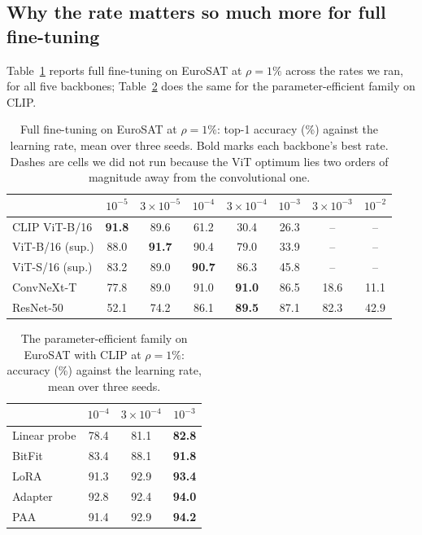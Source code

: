 \documentclass[preprint,12pt]{elsarticle}
\begin{document}
\subsection{Why the rate matters so much more for full fine-tuning}
\label{sec:lr}

Table~\ref{tab:lr-full} reports full fine-tuning on EuroSAT at $\rho=1\%$ across
the rates we ran, for all five backbones; Table~\ref{tab:lr-peft} does the same
for the parameter-efficient family on CLIP.

\begin{table}[t]
\centering
\caption{Full fine-tuning on EuroSAT at $\rho=1\%$: top-1 accuracy (\%) against the learning rate, mean over three seeds. Bold marks each backbone's best rate. Dashes are cells we did not run because the ViT optimum lies two orders of magnitude away from the convolutional one.}
\label{tab:lr-full}
\small
\setlength{\tabcolsep}{4pt}
\begin{tabular}{lccccccc}
\toprule
 & $10^{-5}$ & $3\times10^{-5}$ & $10^{-4}$ & $3\times10^{-4}$ & $10^{-3}$ & $3\times10^{-3}$ & $10^{-2}$ \\
\midrule
CLIP ViT-B/16 & \textbf{91.8} & 89.6 & 61.2 & 30.4 & 26.3 & -- & -- \\
ViT-B/16 (sup.) & 88.0 & \textbf{91.7} & 90.4 & 79.0 & 33.9 & -- & -- \\
ViT-S/16 (sup.) & 83.2 & 89.0 & \textbf{90.7} & 86.3 & 45.8 & -- & -- \\
ConvNeXt-T & 77.8 & 89.0 & 91.0 & \textbf{91.0} & 86.5 & 18.6 & 11.1 \\
ResNet-50 & 52.1 & 74.2 & 86.1 & \textbf{89.5} & 87.1 & 82.3 & 42.9 \\
\bottomrule
\end{tabular}
\end{table}

\begin{table}[t]
\centering
\caption{The parameter-efficient family on EuroSAT with CLIP at $\rho=1\%$: accuracy (\%) against the learning rate, mean over three seeds.}
\label{tab:lr-peft}
\small
\setlength{\tabcolsep}{4pt}
\begin{tabular}{lccc}
\toprule
 & $10^{-4}$ & $3\times10^{-4}$ & $10^{-3}$ \\
\midrule
Linear probe & 78.4 & 81.1 & \textbf{82.8} \\
BitFit & 83.4 & 88.1 & \textbf{91.8} \\
LoRA & 91.3 & 92.9 & \textbf{93.4} \\
Adapter & 92.8 & 92.4 & \textbf{94.0} \\
PAA & 91.4 & 92.9 & \textbf{94.2} \\
\bottomrule
\end{tabular}
\end{table}
\end{document}
